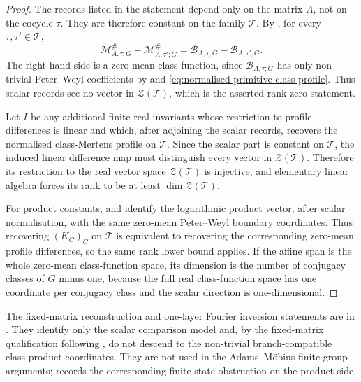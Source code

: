 \documentclass[11pt,a4paper]{amsart}
\theoremstyle{plain}
\theoremstyle{definition}
\theoremstyle{remark}
\begin{document}
\begin{proof}
  The records listed in the statement depend only on the matrix \(A\), not on
  the cocycle \(\tau\).  They are therefore constant on the family
  \(\mathscr T\).  By
  , for every
  \(\tau,\tau'\in\mathscr T\),
  \[
    \mathcal M^\#_{A,\tau;G}-\mathcal M^\#_{A,\tau';G}
    =
    \mathcal B_{A,\tau;G}-\mathcal B_{A,\tau';G}.
  \]
  The right-hand side is a zero-mean class function, since
  \(\mathcal B_{A,\tau;G}\) has only non-trivial Peter--Weyl coefficients by
   and
  \eqref{eq:normalised-primitive-class-profile}.  Thus scalar records see no
  vector in \(\mathcal Z(\mathscr T)\), which is the asserted rank-zero
  statement.

  Let \(I\) be any additional finite real invariants whose restriction
  to profile differences is linear and which, after adjoining the scalar
  records, recovers the normalised class-Mertens profile on \(\mathscr T\).
  Since the scalar part is constant on \(\mathscr T\), the induced linear
  difference map must distinguish every vector in
  \(\mathcal Z(\mathscr T)\).  Therefore its restriction to the real vector
  space \(\mathcal Z(\mathscr T)\) is injective, and elementary linear algebra
  forces its rank to be at least \(\dim\mathcal Z(\mathscr T)\).

  For product constants,  and
   identify the logarithmic
  product vector, after scalar normalisation, with the same zero-mean
  Peter--Weyl boundary coordinates.  Thus recovering \((K_C)_C\) on
  \(\mathscr T\) is equivalent to recovering the corresponding zero-mean
  profile differences, so the same rank lower bound applies.  If the affine
  span is the whole zero-mean class-function space, its dimension is the
  number of conjugacy classes of \(G\) minus one, because the full real
  class-function space has one coordinate per conjugacy class and the scalar
  direction is one-dimensional.
\end{proof}

\noindent
The fixed-matrix reconstruction and one-layer Fourier inversion
statements are
 in
. They identify only the scalar comparison
model and, by the fixed-matrix qualification following , do not descend to the
non-trivial branch-compatible class-product coordinates. They are not used in
the Adams--M\"obius finite-group arguments;
 records the
corresponding finite-state obstruction on the product side.
\end{document}
